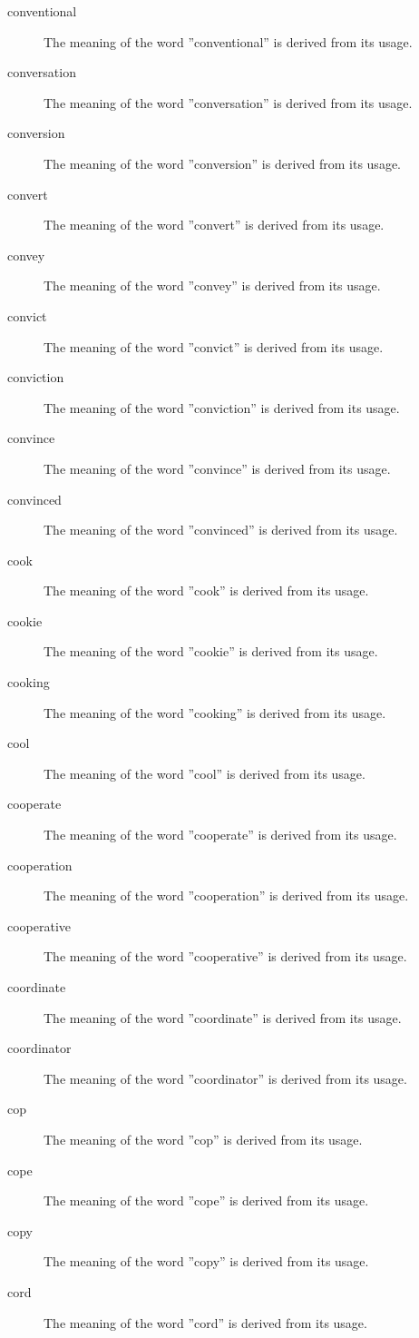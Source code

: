 \documentclass[12pt, letterpaper]{memoir}
\begin{document}
\begin{description}
\item[conventional] The meaning of the word ''conventional'' is derived from its usage.
\item[conversation] The meaning of the word ''conversation'' is derived from its usage.
\item[conversion] The meaning of the word ''conversion'' is derived from its usage.
\item[convert] The meaning of the word ''convert'' is derived from its usage.
\item[convey] The meaning of the word ''convey'' is derived from its usage.
\item[convict] The meaning of the word ''convict'' is derived from its usage.
\item[conviction] The meaning of the word ''conviction'' is derived from its usage.
\item[convince] The meaning of the word ''convince'' is derived from its usage.
\item[convinced] The meaning of the word ''convinced'' is derived from its usage.
\item[cook] The meaning of the word ''cook'' is derived from its usage.
\item[cookie] The meaning of the word ''cookie'' is derived from its usage.
\item[cooking] The meaning of the word ''cooking'' is derived from its usage.
\item[cool] The meaning of the word ''cool'' is derived from its usage.
\item[cooperate] The meaning of the word ''cooperate'' is derived from its usage.
\item[cooperation] The meaning of the word ''cooperation'' is derived from its usage.
\item[cooperative] The meaning of the word ''cooperative'' is derived from its usage.
\item[coordinate] The meaning of the word ''coordinate'' is derived from its usage.
\item[coordinator] The meaning of the word ''coordinator'' is derived from its usage.
\item[cop] The meaning of the word ''cop'' is derived from its usage.
\item[cope] The meaning of the word ''cope'' is derived from its usage.
\item[copy] The meaning of the word ''copy'' is derived from its usage.
\item[cord] The meaning of the word ''cord'' is derived from its usage.

\end{description}
\end{document}
